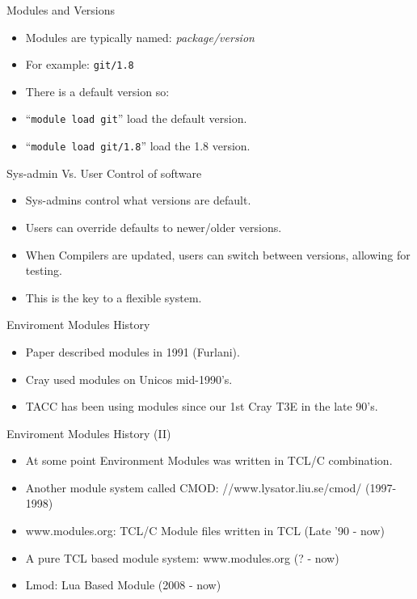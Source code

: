\documentclass{beamer}
\begin{document}
\begin{frame}{Modules and Versions}
  \begin{itemize}
    \item Modules are typically named: \emph{package/version}
    \item For example: \texttt{git/1.8}
    \item There is a default version so:
    \item ``\texttt{module load git}'' load the default version.
    \item ``\texttt{module load git/1.8}'' load the 1.8 version.
  \end{itemize}
\end{frame}

\begin{frame}{Sys-admin Vs. User Control of software}
  \begin{itemize}
    \item Sys-admins control what versions are default.
    \item Users can override defaults to newer/older versions.
    \item When Compilers are updated, users can switch between
      versions, allowing for testing.
    \item This is the key to a flexible system.
  \end{itemize}
\end{frame}

\begin{frame}{Enviroment Modules History}
  \begin{itemize}
    \item Paper described modules in 1991 (Furlani).
    \item Cray used modules on Unicos mid-1990's.
    \item TACC has been using modules since our 1st Cray T3E in the
      late 90's.
  \end{itemize}
\end{frame}

\begin{frame}{Enviroment Modules History (II)}
  \begin{itemize}
    \item At some point Environment Modules was written in TCL/C combination.
    \item Another module system called CMOD:
      //www.lysator.liu.se/cmod/ (1997-1998)
    \item www.modules.org: TCL/C Module files written in TCL (Late '90 - now)
    \item A pure TCL based module system: www.modules.org (? - now) 
    \item Lmod: Lua Based Module  (2008 - now)
  \end{itemize}
\end{frame}
\end{document}
